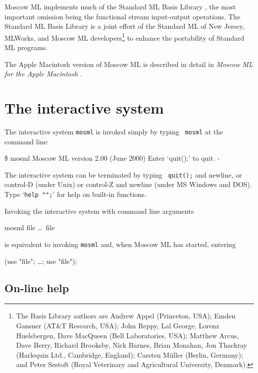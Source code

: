 \documentclass[fleqn]{article}
\begin{document}
Moscow ML implements much of the Standard ML Basis Library
\cite{SMLBasis:1996:StandardML}, the most important omission being the
functional stream input-output operations.  The Standard ML Basis
Library is a joint effort of the Standard ML of New Jersey, MLWorks,
and Moscow ML developers\footnote{The Basis Library authors are Andrew
  Appel (Princeton, USA); Emden Gansner (AT\&T Research, USA); John
  Reppy, Lal George, Lorenz Huelsbergen, Dave MacQueen (Bell
  Laboratories, USA); Matthew Arcus, Dave Berry, Richard Brooksby,
  Nick Barnes, Brian Monahan, Jon Thackray (Harlequin Ltd., Cambridge,
  England); Carsten M{\"u}ller (Berlin, Germany); and Peter Sestoft
  (Royal Veterinary and Agricultural University, Denmark).} to enhance
the portability of Standard ML programs.

The Apple Macintosh version of Moscow ML is described in detail in
\emph{Moscow ML for the Apple Macintosh}
\cite{Currie:1999:MoscowMLMac}.


\section{The interactive system}
\label{sec-interactive-system}

The interactive system {\tt mosml} is invoked simply by typing {\tt
  mosml} at the command line:

\begin{program}
\$ mosml
Moscow ML version 2.00 (June 2000)
Enter `quit();' to quit.
- 
\end{program}

\noindent The interactive system can be terminated by typing {\tt
  quit();} and newline, or control-D (under Unix) or control-Z and
newline (under MS Windows and DOS).  Type `{\tt help "";}' for help on
built-in functions.

Invoking the interactive system with command line arguments

\begin{program}
mosml file \ldots\ file
\end{program}

\noindent is equivalent to invoking {\tt mosml} and, when Moscow ML
has started, entering

\begin{program}
(use "file"; \ldots; use "file");  
\end{program}


\subsection{On-line help}
\label{sec-mosml-help}
\end{document}
